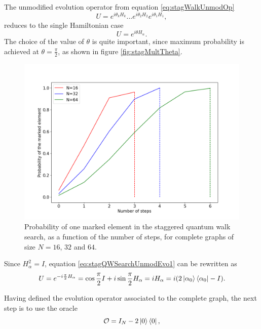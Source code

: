 \documentclass[../../dissertation.tex]{subfiles}
\begin{document}
The unmodified evolution operator from equation \eqref{eq:stagWalkUnmodOp}
\begin{equation}
	U = e^{i\theta_{k}H_{k}}...e^{i\theta_{2}H_{2}}e^{i\theta_{1}H_{1}},
\end{equation}
reduces to the single Hamiltonian case
\begin{equation}
	U = e^{i\theta H_\alpha}.
	\label{eq:stagQWSearchUnmodEvo1}
\end{equation}
The choice of the value of $\theta$ is quite important, since maximum probability
is achieved at $\theta = \frac{\pi}{2}$, as shown in figure
\ref{fig:stagMultTheta}.
\begin{figure}[!h]
	\centering
	\includegraphics[scale=0.40]{img/StagQuantumWalk/Search/163264.png}
	\caption{Probability of one marked element in the staggered quantum walk search, as a function of the number of steps, for complete graphs of size $N=16$, $32$ and $64$.}
	\label{fig:StagSearch}
\end{figure}\par
Since $H_\alpha^2 = I$, equation \eqref{eq:stagQWSearchUnmodEvo1} can be
rewritten as
\begin{equation}
	U = e^{-i\frac{\pi}{2} H_\alpha} = \cos{\frac{\pi}{2}I} + i\sin{\frac{\pi}{2}H_\alpha} = i H_\alpha = i(2\ket{\alpha_0}\bra{\alpha_0} - I).
\end{equation}\par
Having defined the evolution operator associated to the complete graph,
the next step is to use the oracle
\begin{equation}
	\mathcal{O} = I_N - 2\ket{0}\bra{0},
\end{equation}
\end{document}
